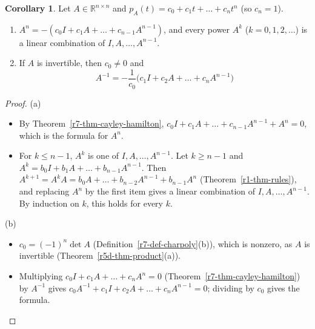 \documentclass[12pt]{article}
\newcommand{\R}{\mathbb R}
\theoremstyle{definition}
\newtheorem{corollary}[theorem]{Corollary}
\begin{document}
\begin{corollary}\label{r7-cor-cayley-hamilton}
Let \(A\in\R^{n\times n}\) and \(p_A(t)=c_0+c_1t+\dots+c_nt^n\) (so \(c_n=1\)).
\begin{enumerate}
\item \(A^n=-(c_0I+c_1A+\dots+c_{n-1}A^{n-1})\), and every power \(A^k\) (\(k=0,1,2,\dots\)) is a linear combination of
\(I,A,\dots,A^{n-1}\).
\item If \(A\) is invertible, then \(c_0\ne0\) and
\[
A^{-1}=-\frac1{c_0}\bigl(c_1I+c_2A+\dots+c_nA^{n-1}\bigr)
\]
\end{enumerate}
\end{corollary}
\begin{proof}
(a)
\begin{itemize}
\item By Theorem~\ref{r7-thm-cayley-hamilton}, \(c_0I+c_1A+\dots+c_{n-1}A^{n-1}+A^n=0\), which is the formula for \(A^n\).
\item For \(k\leqslant n-1\), \(A^k\) is one of \(I,A,\dots,A^{n-1}\). Let \(k\geqslant n-1\) and
\(A^k=b_0I+b_1A+\dots+b_{n-1}A^{n-1}\). Then \(A^{k+1}=A^kA=b_0A+\dots+b_{n-2}A^{n-1}+b_{n-1}A^n\)
(Theorem~\ref{r1-thm-rules}), and replacing \(A^n\) by the first item gives a linear combination of
\(I,A,\dots,A^{n-1}\). By induction on \(k\), this holds for every \(k\).
\end{itemize}
(b)
\begin{itemize}
\item \(c_0=(-1)^n\det A\) (Definition~\ref{r7-def-charpoly}(b)), which is nonzero, as \(A\) is invertible
(Theorem~\ref{r5d-thm-product}(a)).
\item Multiplying \(c_0I+c_1A+\dots+c_nA^n=0\) (Theorem~\ref{r7-thm-cayley-hamilton}) by \(A^{-1}\) gives
\(c_0A^{-1}+c_1I+c_2A+\dots+c_nA^{n-1}=0\); dividing by \(c_0\) gives the formula.\qedhere
\end{itemize}
\end{proof}
\end{document}
